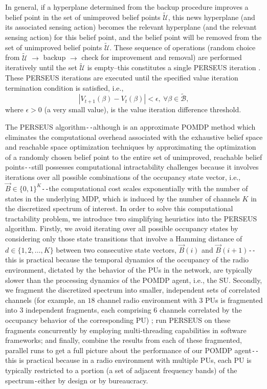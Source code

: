\documentclass[12pt, draftcls, onecolumn]{IEEEtran}
\begin{document}
In general, if a hyperplane determined from the backup procedure improves a belief point in the set of unimproved belief points $\tilde{\mathcal{U}}$, this news hyperplane (and its associated sensing action) becomes the relevant hyperplane (and the relevant sensing action) for this belief point, and the belief point will be removed from the set of unimproved belief points $\tilde{\mathcal{U}}$. These sequence of operations (random choice from $\tilde{\mathcal{U}}$ ${\longrightarrow}$ backup ${\longrightarrow}$ check for improvement and removal) are performed iteratively until the set $\tilde{\mathcal{U}}$ is empty--this constitutes a single PERSEUS iteration . These PERSEUS iterations are executed until the specified value iteration termination condition is satisfied, i.e.,
\begin{equation}\label{29}
    |V_{t+1}(\beta)-V_{t}(\beta)|<\epsilon,\ \forall \beta \in \tilde{\mathcal{B}},
\end{equation}
where $\epsilon{>}0$ (a very small value), is the value iteration difference threshold.

The PERSEUS algorithm\texttt{-{}-}although is an approximate POMDP method which eliminates the computational overhead associated with the exhaustive belief space and reachable space optimization techniques \cite{PUOccupancy:18,PUOccupancy:17} by approximating the optimization of a randomly chosen belief point to the entire set of unimproved, reachable belief points\texttt{-{}-}still possesses computational intractability challenges because it involves iterations over all possible combinations of the occupancy state vector, i.e., $\vec{B}{\in}\{0,1\}^{K}$\texttt{-{}-}the computational cost scales exponentially with the number of states in the underlying MDP, which is induced by the number of channels $K$ in the discretized spectrum of interest. In order to solve this computational tractability problem, we introduce two simplifying heuristics into the PERSEUS algorithm. Firstly, we avoid iterating over all possible occupancy states by considering only those state transitions that involve a Hamming distance of $d{\in}\{1,2,\dots,K\}$ between two consecutive state vectors, $\vec{B}(i)$ and $\vec{B}(i+1)$\texttt{-{}-}this is practical because the temporal dynamics of the occupancy of the radio environment, dictated by the behavior of the PUs in the network, are typically slower than the processing dynamics of the POMDP agent, i.e., the SU. Secondly, we fragment the discretized spectrum into smaller, independent sets of correlated channels (for example, an $18$ channel radio environment with $3$ PUs is fragmented into $3$ independent fragments, each comprising $6$ channels correlated by the occupancy behavior of the corresponding PU) ; run PERSEUS on these fragments concurrently by employing multi-threading capabilities in software frameworks; and finally, combine the results from each of these fragmented, parallel runs to get a full picture about the performance of our POMDP agent\texttt{-{}-}this is practical because in a radio environment with multiple PUs, each PU is typically restricted to a portion (a set of adjacent frequency bands) of the spectrum\texttt{-}either by design or by bureaucracy.
\end{document}
